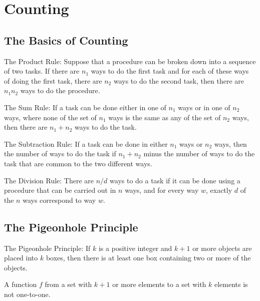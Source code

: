 \documentclass[../discrete.tex]{subfiles}
\begin{document}
\chapter{Counting}
\section{The Basics of Counting}
\begin{definition}
    The Product Rule: Suppose that a procedure can be broken down into a sequence
    of two tasks. If there are $n_1$ ways to do the first task and for each of these ways of doing the 
    first task, there are $n_2$ ways to do the second task, then there are $n_1n_2$ ways to do the procedure.
\end{definition}

\begin{definition}
    The Sum Rule: If a task can be done either in one of $n_1$ ways or in one of $n_2$
    ways, where none of the set of $n_1$ ways is the same as any of the set of $n_2$ ways, then there are 
    $n_1+n_2$ ways to do the task.
\end{definition}

\begin{definition}
    The Subtraction Rule: If a task can be done in either $n_1$ ways or $n_2$ ways, 
    then the number of ways to do the task if $n_1+n_2$ minus the number of ways to do the task 
    that are common to the two different ways.
\end{definition}

\begin{definition}
    The Division Rule: There are $n/d$ ways to do a task if it can be done using a procedure 
    that can be carried out in $n$ ways, and for every way $w$, exactly $d$ of the $n$ ways 
    correspond to way $w$.
\end{definition}
\section{The Pigeonhole Principle}
\begin{theorem}
    The Pigeonhole Principle: If $k$ is a positive integer and $k+1$ or more 
    objects are placed into $k$ boxes, then there is at least one box containing two or more of the objects.
\end{theorem}

\begin{corollary}
    A function $f$ from a set with $k+1$ or more elements to a set with $k$ elements is not one-to-one.
\end{corollary}
\end{document}
